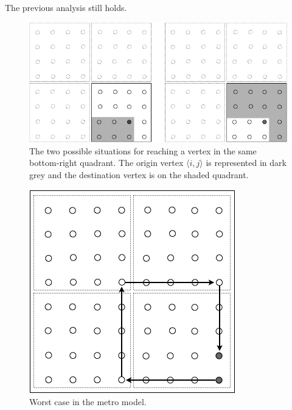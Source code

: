 \begin{itemize}
\begin{enumerate}
 The previous analysis still holds. 
 \end{enumerate}
  \begin{figure}[hbt]
\begin{center}
       \includegraphics[scale=0.4]{FiguresGraph/routingWorstCase}
       \caption{The two possible situations for reaching a vertex in the same bottom-right quadrant.
       The origin vertex $\langle i,j \rangle$ is represented in dark grey and the destination vertex is on the shaded quadrant.}
  \label{fig:routingWorstCase}
\end{center}
\end{figure}

 \begin{figure}[hbt]
\begin{center}
       \includegraphics[scale=0.4]{FiguresGraph/routingCitySolution}
       \caption{Worst case in the metro model.}
  \label{fig:routingCitySolution}
\end{center}
\end{figure}


\end{itemize}
